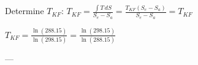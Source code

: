 Determine \( T_{KF} \):  
\( T_{KF} = \frac{\int T \, dS}{S_e - S_a} = \frac{T_{KF} (S_e - S_a)}{S_e - S_a} = T_{KF} \)  

\( T_{KF} = \frac{\ln (288.15)}{\ln (298.15)} = \frac{\ln (298.15)}{\ln (288.15)} \)  

---
